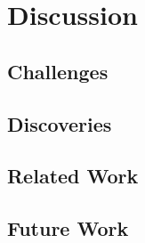 \chapter{Discussion}
\label{chapter:discussion}

\section{Challenges}

\section{Discoveries}

\section{Related Work}

\section{Future Work}


